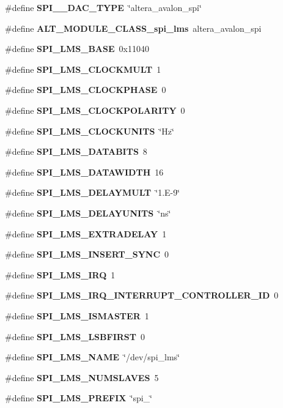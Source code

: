 \begin{DoxyCompactItemize}
\#define {\bf S\+P\+I\+\_\+\_\+\+D\+A\+C\+\_\+\+T\+Y\+PE}~\char`\"{}altera\+\_\+avalon\+\_\+spi\char`\"{}
\item 
\#define {\bf A\+L\+T\+\_\+\+M\+O\+D\+U\+L\+E\+\_\+\+C\+L\+A\+S\+S\+\_\+spi\+\_\+lms}~altera\+\_\+avalon\+\_\+spi
\item 
\#define {\bf S\+P\+I\+\_\+\+L\+M\+S\+\_\+\+B\+A\+SE}~0x11040
\item 
\#define {\bf S\+P\+I\+\_\+\+L\+M\+S\+\_\+\+C\+L\+O\+C\+K\+M\+U\+LT}~1
\item 
\#define {\bf S\+P\+I\+\_\+\+L\+M\+S\+\_\+\+C\+L\+O\+C\+K\+P\+H\+A\+SE}~0
\item 
\#define {\bf S\+P\+I\+\_\+\+L\+M\+S\+\_\+\+C\+L\+O\+C\+K\+P\+O\+L\+A\+R\+I\+TY}~0
\item 
\#define {\bf S\+P\+I\+\_\+\+L\+M\+S\+\_\+\+C\+L\+O\+C\+K\+U\+N\+I\+TS}~\char`\"{}Hz\char`\"{}
\item 
\#define {\bf S\+P\+I\+\_\+\+L\+M\+S\+\_\+\+D\+A\+T\+A\+B\+I\+TS}~8
\item 
\#define {\bf S\+P\+I\+\_\+\+L\+M\+S\+\_\+\+D\+A\+T\+A\+W\+I\+D\+TH}~16
\item 
\#define {\bf S\+P\+I\+\_\+\+L\+M\+S\+\_\+\+D\+E\+L\+A\+Y\+M\+U\+LT}~\char`\"{}1.\+E-\/9\char`\"{}
\item 
\#define {\bf S\+P\+I\+\_\+\+L\+M\+S\+\_\+\+D\+E\+L\+A\+Y\+U\+N\+I\+TS}~\char`\"{}ns\char`\"{}
\item 
\#define {\bf S\+P\+I\+\_\+\+L\+M\+S\+\_\+\+E\+X\+T\+R\+A\+D\+E\+L\+AY}~1
\item 
\#define {\bf S\+P\+I\+\_\+\+L\+M\+S\+\_\+\+I\+N\+S\+E\+R\+T\+\_\+\+S\+Y\+NC}~0
\item 
\#define {\bf S\+P\+I\+\_\+\+L\+M\+S\+\_\+\+I\+RQ}~1
\item 
\#define {\bf S\+P\+I\+\_\+\+L\+M\+S\+\_\+\+I\+R\+Q\+\_\+\+I\+N\+T\+E\+R\+R\+U\+P\+T\+\_\+\+C\+O\+N\+T\+R\+O\+L\+L\+E\+R\+\_\+\+ID}~0
\item 
\#define {\bf S\+P\+I\+\_\+\+L\+M\+S\+\_\+\+I\+S\+M\+A\+S\+T\+ER}~1
\item 
\#define {\bf S\+P\+I\+\_\+\+L\+M\+S\+\_\+\+L\+S\+B\+F\+I\+R\+ST}~0
\item 
\#define {\bf S\+P\+I\+\_\+\+L\+M\+S\+\_\+\+N\+A\+ME}~\char`\"{}/dev/spi\+\_\+lms\char`\"{}
\item 
\#define {\bf S\+P\+I\+\_\+\+L\+M\+S\+\_\+\+N\+U\+M\+S\+L\+A\+V\+ES}~5
\item 
\#define {\bf S\+P\+I\+\_\+\+L\+M\+S\+\_\+\+P\+R\+E\+F\+IX}~\char`\"{}spi\+\_\+\char`\"{}
\item 

\end{DoxyCompactItemize}
